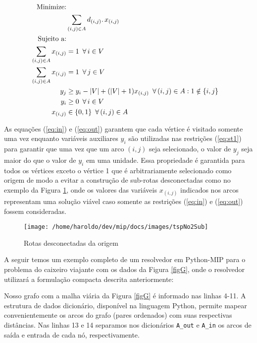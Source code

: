 \documentclass[a4paper,11pt,fleqn]{article}
\begin{document}
\begin{align}
\textrm{Minimize:}\nonumber \\
& \sum_{(i,j)\in A}d_{(i,j)}\ldotp x_{(i,j)}\nonumber \\
\textrm{Sujeito a:}\nonumber \\
\sum_{(i,j)\in A}x_{(i,j)} & =1\,\,\,\forall\,i\in V\label{eq:in}\\
\sum_{(i,j)\in A}x_{(i,j)} & =1\,\,\,\forall\,j\in V\label{eq:out}\\
y_{j} & \geq y_{i}-|V|+(|V|+1)x_{(i,j)}\,\,\,\forall\,(i,j)\in A:1\notin\{i,j\}\label{eq:st1}\\
y_{i} & \geq0\,\,\,\forall\,i\in V\label{eq:y}\\
x_{(i,j)} & \in\{0,1\}\,\,\,\forall\,(i,j)\in A\label{eq:x}
\end{align}

As equações (\ref{eq:in}) e (\ref{eq:out}) garantem que cada vértice
é visitado somente uma vez enquanto variáveis auxiliares $y_{i}$
são utilizadas nas restrições (\ref{eq:st1}) para garantir que uma vez
que um arco $(i,j)$ seja selecionado, o valor de $y_{j}$ seja maior
do que o valor de $y_{i}$ em uma unidade. Essa propriedade é garantida
para todos os vértices exceto o vértice 1 que é arbitrariamente selecionado
como origem de modo a evitar a construção de sub-rotas desconectadas
como no exemplo da Figura \ref{figSub}, onde os valores das variáveis
$x_{(i,j)}$ indicados nos arcos representam uma solução viável caso
somente as restrições (\ref{eq:in}) e (\ref{eq:out}) fossem consideradas.

\begin{figure}
	\begin{centering}
		\texttt{[image: /home/haroldo/dev/mip/docs/images/tspNo2Sub]}
		\par\end{centering}
	\caption{Rotas desconectadas da origem}
	\label{figSub}
	
\end{figure}

A seguir temos um exemplo completo de um resolvedor em Python-MIP para o problema do caixeiro viajante com os dados da Figura \ref{figG}, onde o resolvedor utilizará a formulação compacta descrita anteriormente:

{\small

}

Nosso grafo com a malha viária da Figura \ref{figG} é informado nas linhas 4-11. A estrutura de dados dicionário, disponível na linguagem Python, permite mapear convenientemente os arcos do grafo (pares ordenados) com suas respectivas distâncias. Nas linhas 13 e 14 separamos nos dicionários \texttt{A\_out} e \texttt{A\_in} os arcos de saída e entrada de cada nó, respectivamente.
\end{document}
